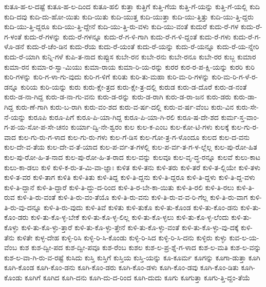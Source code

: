 {ಕುತೂ-ಹ-ಲ-ದಷ್ಟೆ
ಕುತೂ-ಹ-ಲ-ದಿಂದ
ಕುತೂ-ಹಲಿ
ಕುತ್ತಾ
ಕುತ್ತಿಗೆ
ಕುತ್ತಿ-ಗೆಯ
ಕುತ್ತಿ-ಗೆ-ಯನ್ನು
ಕುತ್ತಿ-ಗೆ-ಯಲ್ಲಿ
ಕುದಿ
ಕುದಿ-ದವು
ಕುದಿ-ದು-ಹೋ-ಯಿತು
ಕುದಿ-ಯಿತು
ಕುದಿ-ಯುತ್ತ
ಕುದಿ-ಯುತ್ತಾ
ಕುದಿ-ಯು-ತ್ತಿತ್ತು
ಕುದಿ-ಯು-ತ್ತಿ-ದ್ದರು
ಕುದಿ-ಯು-ತ್ತಿ-ದ್ದರೂ
ಕುದಿ-ಯು-ತ್ತಿ-ದ್ದೇನೆ
ಕುದಿ-ಯು-ತ್ತಿ-ರು-ವಳು
ಕುದಿ-ಯು-ವಂತೆ
ಕುದುರೆ
ಕುದು-ರೆ-ಗಳ
ಕುದು-ರೆ-ಗ-ಳಂತೆ
ಕುದು-ರೆ-ಗಳನ್ನು
ಕುದು-ರೆ-ಗಳನ್ನೂ
ಕುದು-ರೆ-ಗ-ಳಿ-ಗಾಗಿ
ಕುದು-ರೆ-ಗ-ಳಿ-ದ್ದಂತೆ
ಕುದು-ರೆ-ಗಳು
ಕುದು-ರೆ-ಗ-ಳೊ-ಡನೆ
ಕುದು-ರೆ-ಚೆಂ-ಡಿನ
ಕುದು-ರೆಯ
ಕುದು-ರೆ-ಯಂತೆ
ಕುದು-ರೆ-ಯನ್ನು
ಕುದು-ರೆ-ಯನ್ನೂ
ಕುದು-ರೆ-ಯ-ನ್ನೇರಿ
ಕುದು-ರೆ-ಯಾಗಿ
ಕುನ್ನಿ-ಗಳೆ
ಕುಪಿ-ತ-ನಾದ
ಕುಪ್ಪುಸ
ಕುಬೇ-ರನ
ಕುಬೇ-ರನು
ಕುಬೇ-ರನೂ
ಕುಬೇ-ರರ
ಕುಬ್ಜ
ಕುಮಾರ
ಕುಮಾ-ರನ
ಕುಮಾ-ರ-ಸ್ವಾ-ಮಿಯು
ಕುಮಾ-ರಾಯ
ಕುಮಾ-ರಿ-ಯ-ರನ್ನು
ಕುರರ
ಕುರ-ರ-ಪ-ಕ್ಷಿ-ಯನ್ನು
ಕುರರಿ
ಕುರಿ
ಕುರಿ-ಗಳನ್ನು
ಕುರಿ-ಗ-ಳಾ-ಗು-ವುದು
ಕುರಿ-ಗ-ಳಿಗೆ
ಕುರಿತು
ಕುರಿ-ತು-ಮಹಾ
ಕುರಿ-ಮ-ರಿ-ಗಳನ್ನು
ಕುರಿ-ಮ-ರಿ-ಗ-ಳೆ-ರ-ಡನ್ನೂ
ಕುರಿಯ
ಕುರಿ-ಯನ್ನು
ಕುರು
ಕುರು-ಕ್ಷೇ-ತ್ರದ
ಕುರು-ಕ್ಷೇ-ತ್ರ-ದಲ್ಲಿ
ಕುರುಡ
ಕುರು-ಡ-ದೊರೆ
ಕುರು-ಡ-ನಂತೆ
ಕುರು-ಡ-ನಾ-ಗಿದ್ದ
ಕುರು-ಡ-ನಾ-ಗು-ವನು
ಕುರು-ಡ-ರನ್ನು
ಕುರು-ಡ-ರಾಗಿ
ಕುರು-ಡ-ರಾ-ಜನ
ಕುರು-ಡರು
ಕುರು-ಡಾ-ಗಿದ್ದ
ಕುರು-ಣೆ-ಗಾಗಿ
ಕುರು-ಬ-ರಾಗಿ
ಕುರು-ವಂ-ಶದ
ಕುರು-ವ-ರ್ಷ-ದಲ್ಲಿ
ಕುರು-ವ-ರ್ಷ-ವೆಂಬ
ಕುರು-ವಿನ
ಕುರು-ಸೇ-ನೆ-ಯನ್ನು
ಕುರೂಪಿ
ಕುರೂ-ಪಿಗೆ
ಕುರೂ-ಪಿ-ಯಾ-ಗಿದ್ದ
ಕುರೂ-ಪಿ-ಯಾ-ಗಿ-ರಲಿ
ಕುರೂ-ಷ-ದೇ-ಶದ
ಕುರ್ಮ-ಸ್ತ-ವಾಂ-ಗ-ಪ-ಯ-ಸೋ-ಪ-ಸೇ-ಚನಂ
ಕುರ್ಯಾ-ದ್ವಿ-ನೇ-ಶ್ವರಂ
ಕುಲ
ಕುಲ-ಕ-ಎಂಬ
ಕುಲ-ಕೋ-ಟಿ-ಗಳು
ಕುಲಕ್ಕೆ
ಕುಲ-ಗು-ರ-ವಾದ
ಕುಲ-ಗು-ರು-ಗ-ಳಾದ
ಕುಲ-ಗು-ರು-ಗಳು
ಕುಲ-ಗೆ-ಡಿಸ
ಕುಲ-ಗೋ-ತ್ರ-ಗ-ಳೊಂದೂ
ಕುಲದ
ಕುಲ-ದ-ವನು
ಕುಲ-ದೇ-ವ-ತೆಯ
ಕುಲ-ದೇ-ವ-ತೆ-ಯಾದ
ಕುಲ-ಪ-ರ್ವ-ತ-ಗಳಲ್ಲಿ
ಕುಲ-ಪ-ರ್ವ-ತ-ಗ-ಳ-ಲ್ಲೆಲ್ಲ
ಕುಲ-ಪು-ರೋ-ಹಿತ
ಕುಲ-ಪು-ರೋ-ಹಿ-ತ-ನಾದ
ಕುಲ-ಪು-ರೋ-ಹಿ-ತ-ರಾದ
ಕುಲ-ವನ್ನು
ಕುಲವೂ
ಕುಲ-ವೃ-ದ್ಧ-ರನ್ನೂ
ಕುಲವೆ
ಕುಲು-ಕಾಟ
ಕುಲು-ಕಾ-ಡಲು
ಕುಳಿ
ಕುಳಿ-ಕ-ರು-ತ-ಮಿ-ವಾ-ಜ್ಞಾಃ
ಕುಳಿತ
ಕುಳಿ-ತನು
ಕುಳಿ-ತರು
ಕುಳಿ-ತರೆ
ಕುಳಿ-ತ-ಲ್ಲಿಯೇ
ಕುಳಿ-ತಳು
ಕುಳಿ-ತ-ವರ
ಕುಳಿ-ತಾಗ
ಕುಳಿತಿ
ಕುಳಿ-ತಿತು
ಕುಳಿ-ತಿದ್ದ
ಕುಳಿ-ತಿ-ದ್ದನು
ಕುಳಿ-ತಿ-ದ್ದರೂ
ಕುಳಿ-ತಿ-ದ್ದಳು
ಕುಳಿ-ತಿ-ದ್ದ-ವಳು
ಕುಳಿ-ತಿ-ದ್ದಾನೆ
ಕುಳಿ-ತಿ-ದ್ದಾರೆ
ಕುಳಿ-ತಿ-ದ್ದು-ದ-ರಿಂದ
ಕುಳಿ-ತಿ-ರ-ಬೇ-ಕಾ-ಯಿತು
ಕುಳಿ-ತಿ-ರಲಿ
ಕುಳಿ-ತಿ-ರಲು
ಕುಳಿ-ತಿ-ರುವ
ಕುಳಿ-ತಿ-ರು-ವಂತೆ
ಕುಳಿ-ತಿ-ರು-ವಂ-ತೆಯೊ
ಕುಳಿ-ತಿ-ರು-ವನು
ಕುಳಿ-ತಿ-ರು-ವ-ವ-ರಿ-ಗೆಲ್ಲ
ಕುಳಿ-ತಿ-ರು-ವಾಗ
ಕುಳಿ-ತಿ-ರು-ವು-ದನ್ನೂ
ಕುಳಿ-ತಿ-ರು-ವುದು
ಕುಳಿ-ತಿವೆ
ಕುಳಿತು
ಕುಳಿ-ತುಕೊ
ಕುಳಿ-ತು-ಕೊಂಡ
ಕುಳಿ-ತು-ಕೊಂ-ಡನು
ಕುಳಿ-ತು-ಕೊಂ-ಡರು
ಕುಳಿ-ತು-ಕೊ-ಳ್ಳ-ಬೇಕೆ
ಕುಳಿ-ತು-ಕೊ-ಳ್ಳ-ಲಿಲ್ಲ
ಕುಳಿ-ತು-ಕೊ-ಳ್ಳಲು
ಕುಳಿ-ತು-ಕೊ-ಳ್ಳ-ಲೆಂದು
ಕುಳಿ-ತು-ಕೊಳ್ಳು
ಕುಳಿ-ತು-ಕೊ-ಳ್ಳು-ತ್ತಾರೆ
ಕುಳಿ-ತು-ಕೊ-ಳ್ಳು-ತ್ತೇನೆ
ಕುಳಿ-ತು-ಕೊ-ಳ್ಳು-ವಂತೆ
ಕುಳಿ-ತು-ಕೊ-ಳ್ಳು-ವು-ದಕ್ಕೆ
ಕುಳಿ-ತೆನು
ಕುಳಿತೇ
ಕುಳ್ಳ-ದೇಹ
ಕುಳ್ಳಿ-ರಿಸಿ
ಕುಳ್ಳಿ-ರಿ-ಸಿ-ಕೊಂಡು
ಕುಳ್ಳಿ-ರಿ-ಸಿದ
ಕುಳ್ಳಿ-ರಿ-ಸಿ-ದನು
ಕುಳ್ಳಿರು
ಕುಳ್ಳು
ಕುವ-ಲ-ಯ-ವೆಂಬ
ಕುಶ
ಕುಶ-ದ್ವೀ-ಪದ
ಕುಶ-ದ್ವೀ-ಪವೂ
ಕುಶ-ರೆಂಬ
ಕುಶಲ
ಕುಶ-ಲ-ಪ್ರ-ಶ್ನೆ-ಗ-ಳಾದ
ಕುಶ-ಲ-ಮತಿ
ಕುಶ-ಲ-ವನ್ನು
ಕುಶ-ಲ-ವಾ-ಗಿ-ರು-ವ-ರಷ್ಟೆ
ಕುಸಿದು
ಕುಸ್ತಿ
ಕುಸ್ತಿಗೆ
ಕುಸ್ತಿಯ
ಕುಸ್ತಿ-ಯನ್ನು
ಕೂ-ಕೂರ್ಮ
ಕೂಗನ್ನು
ಕೂಗಾ-ಡುತ್ತಾ
ಕೂಗಿ
ಕೂಗಿ-ಕೊಂಡ
ಕೂಗಿ-ಕೊಂ-ಡನು
ಕೂಗಿ-ಕೊಂ-ಡರು
ಕೂಗಿ-ಕೊಂ-ಡಳು
ಕೂಗಿ-ಕೊಂ-ಡವು
ಕೂಗಿ-ಕೊಂ-ಡಿತು
ಕೂಗಿ-ಕೊಂಡು
ಕೂಗಿಗೆ
ಕೂಗಿದ
ಕೂಗಿ-ದನು
ಕೂಗಿ-ದು-ದ-ರಿಂದ
ಕೂಗಿ-ದುದು
ಕೂಗು
ಕೂಗುತ್ತಾ
ಕೂಗು-ತ್ತಿ-ದ್ದಂ-ತೆಯೆ
}
